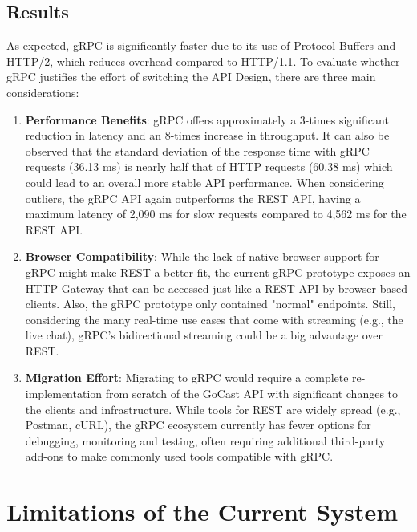 \subsection{Results}

As expected, \ac{gRPC} is significantly faster due to its use of Protocol Buffers and HTTP/2, which reduces overhead compared to HTTP/1.1. To evaluate whether \ac{gRPC} justifies the effort of switching the \ac{API} Design, there are three main considerations:

\begin{enumerate}
    \item \textbf{Performance Benefits}: \ac{gRPC} offers approximately a 3-times significant reduction in latency and an 8-times increase in throughput. It can also be observed that the standard deviation of the response time with \ac{gRPC} requests (36.13 ms) is nearly half that of HTTP requests (60.38 ms) which could lead to an overall more stable \ac{API} performance.  When considering outliers, the \ac{gRPC} \ac{API} again outperforms the \ac{REST} \ac{API}, having a maximum latency of 2,090 ms for slow requests compared to 4,562 ms for the \ac{REST} \ac{API}.

    \item \textbf{Browser Compatibility}: While the lack of native browser support for \ac{gRPC} might make \ac{REST} a better fit, the current \ac{gRPC} prototype exposes an HTTP Gateway that can be accessed just like a \ac{REST} \ac{API} by browser-based clients. Also, the \ac{gRPC} prototype only contained "normal" endpoints. Still, considering the many real-time use cases that come with streaming (e.g., the live chat), \ac{gRPC}’s bidirectional streaming could be a big advantage over \ac{REST}.

    \item \textbf{Migration Effort}: Migrating to \ac{gRPC} would require a complete re-implementation from scratch of the GoCast \ac{API} with significant changes to the clients and infrastructure. While tools for \ac{REST} are widely spread (e.g., Postman, cURL), the \ac{gRPC} ecosystem currently has fewer options for debugging, monitoring and testing, often requiring additional third-party add-ons to make commonly used tools compatible with \ac{gRPC}.
\end{enumerate}

\section{Limitations of the Current System}

